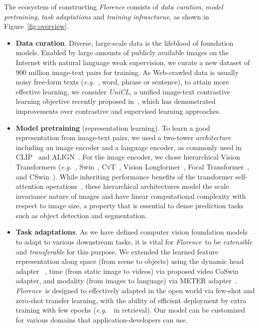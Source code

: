 \documentclass{article}
\newcommand{\eg}{{\it{e.g.}~}}
\newcommand{\Florence}{\emph{Florence~}}
\begin{document}
The ecosystem of constructing \emph{Florence} consists of \emph{data curation}, \emph{model pretraining}, \emph{task adaptations} and \emph{training infrascturue}, as shown in Figure~\ref{fig:overview}.
\begin{itemize}
    \item \textbf{Data curation}. Diverse, large-scale data is the lifeblood of foundation models. Enabled by large amounts of publicly available images on the Internet with natural language weak supervision, we curate a new dataset of $900$ million image-text pairs for training. As Web-crawled data is usually noisy free-form texts (\eg, word, phrase or sentence), to attain more effective learning, we consider {\emph{UniCL}}, a unified image-text contrastive learning objective recently proposed in~\cite{Jianwei_UNICL2022}, which has demonstrated improvements over contrastive and supervised learning approaches.

    \item \textbf{Model pretraining} (representation learning). To learn a good representation from image-text pairs, we used a two-tower \emph{architecture} including an image encoder and a language encoder, as commonly used in CLIP~\cite{radford2021learning} and ALIGN~\cite{jia2021scaling}. For the image encoder, we chose hierarchical Vision Transformers (\eg, Swin~\cite{liu2021Swin}, CvT~\cite{Wu_2021_ICCV}, Vision Longformer~\cite{zhang2021multi}, Focal Transformer~\cite{yang2021focal}, and CSwin~\cite{dong2021cswin}). While inheriting performance benefits of the transformer self-attention operations~\cite{dosovitskiy2021image}, these hierarchical architectures model the scale invariance nature of images and have linear computational complexity with respect to image size, a property that is essential to dense prediction tasks such as object detection and segmentation.

    \item \textbf{Task adaptations}. As we have defined computer vision foundation models to adapt to various downstream tasks, it is vital for \Florence to be \emph{extensible} and \emph{transferable} for this purpose. We extended the learned feature representation along space (from scene to objects) using the dynamic head adapter ~\cite{Dai_2021_CVPR}, time (from static image to videos) via proposed video CoSwin adapter, and modality (from images to language) via METER adapter~\cite{dou2021empirical}. \Florence is designed to effectively adapted in the open world via few-shot and zero-shot transfer learning, with the ability of efficient deployment by extra training with few epochs (\eg ~in retrieval). Our model can be customized for various domains that application-developers can use.


\end{itemize}
\end{document}
